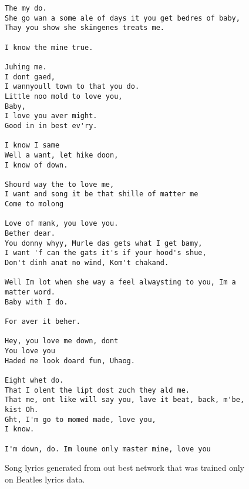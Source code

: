 \documentclass[10pt,twocolumn,letterpaper]{article}
\begin{document}
		\begin{figure}
			\begin{lstlisting}
The my do.
She go wan a some ale of days it you get bedres of baby,
Thay you show she skingenes treats me.

I know the mine true.

Juhing me.
I dont gaed,
I wannyoull town to that you do.
Little noo mold to love you,
Baby,
I love you aver might.
Good in in best ev'ry.

I know I same
Well a want, let hike doon,
I know of down.

Shourd way the to love me,
I want and song it be that shille of matter me
Come to molong

Love of mank, you love you.
Bether dear.
You donny whyy, Murle das gets what I get bamy,
I want 'f can the gats it's if your hood's shue,
Don't dinh anat no wind, Kom't chakand.

Well Im lot when she way a feel alwaysting to you, Im a matter word.
Baby with I do.

For aver it beher.

Hey, you love me down, dont
You love you
Haded me look doard fun, Uhaog.

Eight whet do.
That I olent the lipt dost zuch they ald me.
That me, ont like will say you, lave it beat, back, m'be, kist Oh.
Ght, I'm go to momed made, love you,
I know.

I'm down, do. Im loune only master mine, love you 
			\end{lstlisting}
			\caption{Song lyrics generated from out best network that was trained only on Beatles lyrics data.}
			\label{notransfer_sample}
		\end{figure}
		
\end{document}
